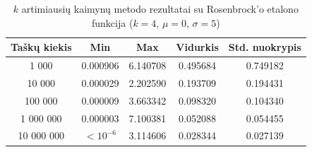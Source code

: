 \begin{table}[H]
    \centering
    \begin{tabular}{|c|c|c|c|c|}
        \hline
        \textbf{Taškų kiekis} & \textbf{Min} & \textbf{Max} & \textbf{Vidurkis} & \textbf{Std. nuokrypis} \\ \hline
        1 000        & 0.000906 & 6.140708 & 0.495684 & 0.749182 \\ \hline
        10 000       & 0.000029 & 2.202590 & 0.193709 & 0.194431 \\ \hline
        100 000      & 0.000009 & 3.663342 & 0.098320 & 0.104340 \\ \hline
        1 000 000    & 0.000003 & 7.100381 & 0.052088 & 0.054455 \\ \hline
        10 000 000   & $<10^{-6}$ & 3.114606 & 0.028344 & 0.027139 \\ \hline
    \end{tabular}
    \caption{$k$ artimiausių kaimynų metodo rezultatai su Rosenbrock'o etalono funkcija ($k = 4$, $\mu = 0$, $\sigma = 5$)}
\end{table}